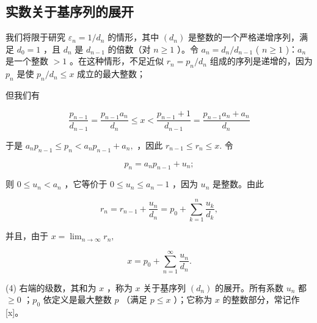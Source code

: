 \subsection{实数关于基序列的展开}

我们将限于研究 \(\varepsilon_{n} = 1 / d_{n}\) 的情形，其中 \((d_n)\) 是整数的一个严格递增序列，满足 \(d_0 = 1\) ，且 \(d_n\) 是 \(d_{n-1}\) 的倍数（对 \(n \geqslant 1\) ）。令 \(a_n = d_n / d_{n-1}\) ( \(n \geqslant 1\) )：\(a_n\) 是一个整数 \(>1\) 。在这种情形，不足近似 \(r_n = p_n / d_n\) 组成的序列是递增的，因为 \(p_n\) 是使 \(p_n / d_n \leqslant x\) 成立的最大整数；

但我们有

\[
\frac {p _ {n - 1}}{d _ {n - 1}} = \frac {p _ {n - 1} a _ {n}}{d _ {n}} \leqslant x <   \frac {p _ {n - 1} + 1}{d _ {n - 1}} = \frac {p _ {n - 1} a _ {n} + a _ {n}}{d _ {n}}
\]

于是 \(a_{n}p_{n - 1}\leqslant p_{n} <   a_{n}p_{n - 1} + a_{n},\) ，因此 \(r_{n - 1}\leqslant r_n\leqslant x.\) 令

\[
p _ {n} = a _ {n} p _ {n - 1} + u _ {n};\tag{2}
\]

则 \(0 \leqslant u_n < a_n\) ，它等价于 \(0 \leqslant u_n \leqslant a_n - 1\) ，因为 \(u_n\) 是整数。由此

\[
r _ {n} = r _ {n - 1} + \frac {u _ {n}}{d _ {n}} = p _ {0} + \sum_ {k = 1} ^ {n} \frac {u _ {k}}{d _ {k}},\tag{3}
\]

并且，由于 \(x = \lim_{n\to \infty}r_n,\)

\[
x = p _ {0} + \sum_ {n = 1} ^ {\infty} \frac {u _ {n}}{d _ {n}}.\tag{4}
\]

(4) 右端的级数，其和为 \(x\) ，称为 \(x\) 关于基序列 \((d_n)\) 的展开。所有系数 \(u_n\) 都 \(\geqslant 0\) ；\(p_0\) 依定义是最大整数 \(p\) （满足 \(p \leqslant x\) ）；它称为 \(x\) 的整数部分，常记作 {[}x{]}。

